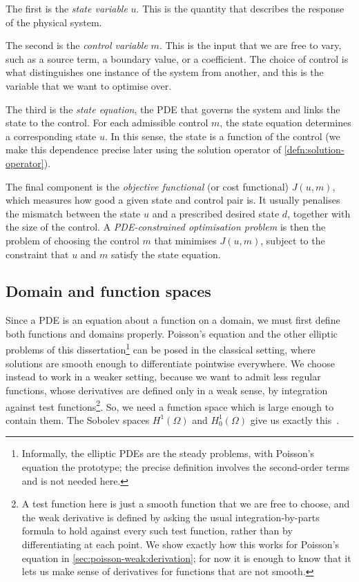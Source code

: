 \documentclass[a4paper,11pt]{article}
\newcommand{\Om}{\Omega}
\theoremstyle{spacedplain} \newtheorem{theorem}[counter]{Theorem} \newtheorem{lemma}[counter]{Lemma} \newtheorem{prop}[counter]{Proposition} \newtheorem{cor}[counter]{Corollary}
\theoremstyle{spaceddefinition} \newtheorem{defn}[counter]{Definition} \newtheorem{example}[counter]{Example} \newtheorem{remark}[counter]{Remark}
\begin{document}
The first is the \emph{state variable} $u$. This is the quantity that describes the response of the physical system. 

The second is the \emph{control variable} $m$. This is the input that we are free to vary, such as a source term, a boundary value, or a coefficient. The choice of control is what distinguishes one instance of the system from another, and this is the variable that we want to optimise over.

The third is the \emph{state equation}, the PDE that governs the system and links the state to the control. For each admissible control $m$, the state equation determines a corresponding state $u$. In this sense, the state is a function of the control (we make this dependence precise later using the solution operator of \cref{defn:solution-operator}).

The final component is the \emph{objective functional} (or cost functional) $J(u, m)$, which measures how good a given state and control pair is. It usually penalises the mismatch between the state $u$ and a prescribed desired state $d$, together with the size of the control. A \emph{PDE-constrained optimisation problem} is then the problem of choosing the control $m$ that minimises $J(u, m)$, subject to the constraint that $u$ and $m$ satisfy the state equation.

\subsection{Domain and function spaces}
\label{sec:prelim:spaces}

Since a PDE is an equation about a function on a domain, we must first define both functions and domains properly. Poisson's equation and the other elliptic problems of this dissertation\footnote{Informally, the elliptic PDEs are the steady problems, with Poisson's equation the prototype; the precise definition involves the second-order terms and is not needed here.} can be posed in the classical setting, where solutions are smooth enough to differentiate pointwise everywhere. We choose instead to work in a weaker setting, because we want to admit less regular functions, whose derivatives are defined only in a weak sense, by integration against test functions\footnote{A test function here is just a smooth function that we are free to choose, and the weak derivative is defined by asking the usual integration-by-parts formula to hold against every such test function, rather than by differentiating at each point. We show exactly how this works for Poisson's equation in \cref{sec:poisson-weak:derivation}; for now it is enough to know that it lets us make sense of derivatives for functions that are not smooth.}. So, we need a function space which is large enough to contain them. The Sobolev spaces $H^1(\Om)$ and $H_0^1(\Om)$ give us exactly this~\citep[Sect.~5.2]{hc2026}.
\end{document}
